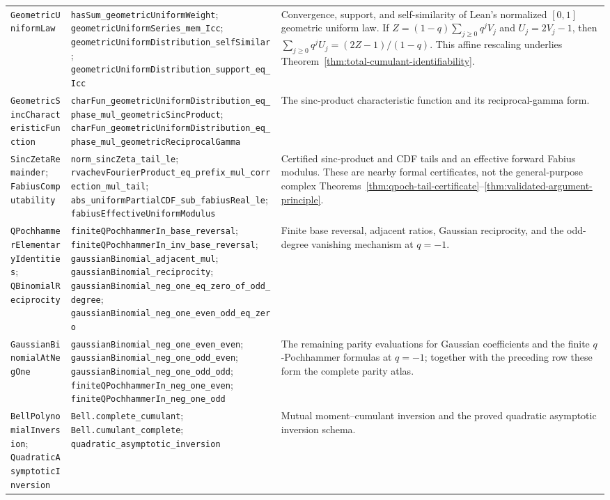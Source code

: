 \begin{longtable}{@{}>{\raggedright\arraybackslash}p{}>{\raggedright\arraybackslash}p{}>{\raggedright\arraybackslash}p{}@{}}
\nolinkurl{GeometricUniformLaw}
&
\nolinkurl{hasSum_geometricUniformWeight};
\nolinkurl{geometricUniformSeries_mem_Icc};
\nolinkurl{geometricUniformDistribution_selfSimilar};
\nolinkurl{geometricUniformDistribution_support_eq_Icc}
&
Convergence, support, and self-similarity of Lean's normalized \([0,1]\)
geometric uniform law.  If
\(Z=(1-q)\sum_{j\ge0}q^jV_j\) and \(U_j=2V_j-1\), then
\(\sum_{j\ge0}q^jU_j=(2Z-1)/(1-q)\).  This affine rescaling underlies
Theorem~\ref{thm:total-cumulant-identifiability}. \\

\nolinkurl{GeometricSincCharacteristicFunction}
&
\nolinkurl{charFun_geometricUniformDistribution_eq_phase_mul_geometricSincProduct};
\nolinkurl{charFun_geometricUniformDistribution_eq_phase_mul_geometricReciprocalGamma}
&
The sinc-product characteristic function and its reciprocal-gamma form. \\

\nolinkurl{SincZetaRemainder};
\nolinkurl{FabiusComputability}
&
\nolinkurl{norm_sincZeta_tail_le};
\nolinkurl{rvachevFourierProduct_eq_prefix_mul_correction_mul_tail};
\nolinkurl{abs_uniformPartialCDF_sub_fabiusReal_le};
\nolinkurl{fabiusEffectiveUniformModulus}
&
Certified sinc-product and CDF tails and an effective forward Fabius modulus.
These are nearby formal certificates, not the general-purpose complex
Theorems~\ref{thm:qpoch-tail-certificate}--\ref{thm:validated-argument-principle}. \\

\nolinkurl{QPochhammerElementaryIdentities};
\nolinkurl{QBinomialReciprocity}
&
\nolinkurl{finiteQPochhammerIn_base_reversal};
\nolinkurl{finiteQPochhammerIn_inv_base_reversal};
\nolinkurl{gaussianBinomial_adjacent_mul};
\nolinkurl{gaussianBinomial_reciprocity};
\nolinkurl{gaussianBinomial_neg_one_eq_zero_of_odd_degree};
\nolinkurl{gaussianBinomial_neg_one_even_odd_eq_zero}
&
Finite base reversal, adjacent ratios, Gaussian reciprocity, and the
odd-degree vanishing mechanism at \(q=-1\). \\

\nolinkurl{GaussianBinomialAtNegOne}
&
\nolinkurl{gaussianBinomial_neg_one_even_even};
\nolinkurl{gaussianBinomial_neg_one_odd_even};
\nolinkurl{gaussianBinomial_neg_one_odd_odd};
\nolinkurl{finiteQPochhammerIn_neg_one_even};
\nolinkurl{finiteQPochhammerIn_neg_one_odd}
&
The remaining parity evaluations for Gaussian coefficients and the finite
\(q\)-Pochhammer formulas at \(q=-1\); together with the preceding row these
form the complete parity atlas. \\

\nolinkurl{BellPolynomialInversion};
\nolinkurl{QuadraticAsymptoticInversion}
&
\nolinkurl{Bell.complete_cumulant};
\nolinkurl{Bell.cumulant_complete};
\nolinkurl{quadratic_asymptotic_inversion}
&
Mutual moment--cumulant inversion and the proved quadratic asymptotic
inversion schema. \\
\end{longtable}
\endgroup

